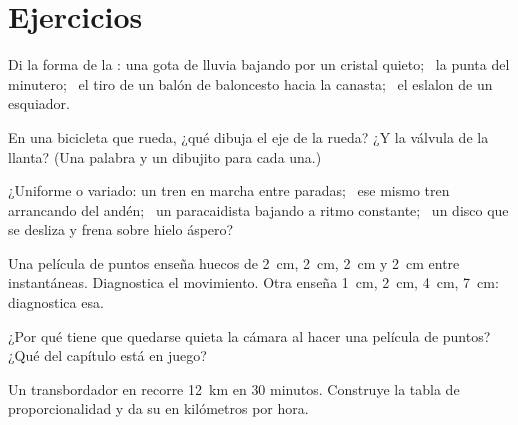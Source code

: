 \section{Ejercicios}

\begin{exercise}[$\star$]\label{exo:g6:describing-motion:1}
Di la forma de la : una gota de lluvia bajando por un
cristal quieto; \ la punta del minutero; \ el tiro de un balón de
baloncesto hacia la canasta; \ el eslalon de un esquiador.
\end{exercise}

\begin{exercise}[$\star$]\label{exo:g6:describing-motion:2}
En una bicicleta que rueda, ¿qué  dibuja el eje de la
rueda? ¿Y la válvula de la llanta? (Una palabra y un dibujito para
cada una.)
\end{exercise}

\begin{exercise}[$\star$]\label{exo:g6:describing-motion:3}
¿Uniforme o variado: un tren en marcha entre paradas; \ ese mismo
tren arrancando del andén; \ un paracaidista bajando a ritmo
constante; \ un disco que se desliza y frena sobre hielo áspero?
\end{exercise}

\begin{exercise}[$\star$]\label{exo:g6:describing-motion:4}
Una película de puntos enseña huecos de \qty{2}{cm}, \qty{2}{cm},
\qty{2}{cm} y \qty{2}{cm} entre instantáneas. Diagnostica el
movimiento. Otra enseña \qty{1}{cm}, \qty{2}{cm}, \qty{4}{cm},
\qty{7}{cm}: diagnostica esa.
\end{exercise}

\begin{exercise}[$\star$]\label{exo:g6:describing-motion:5}
¿Por qué tiene que quedarse quieta la cámara al hacer una película de
puntos? ¿Qué  del capítulo está en juego?
\end{exercise}

\begin{exercise}[$\star$]\label{exo:g6:describing-motion:6}
Un transbordador en  recorre \qty{12}{km} en $30$
minutos. Construye la tabla de proporcionalidad y da su
 en kilómetros por hora.
\end{exercise}

